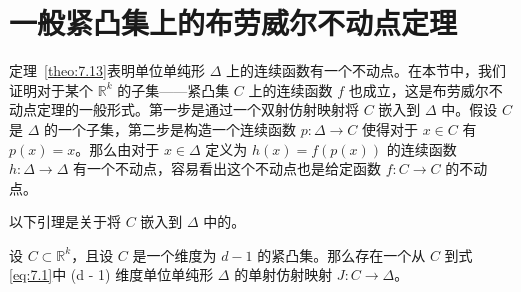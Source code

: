 \section{一般紧凸集上的布劳威尔不动点定理}\label{sec-7.6}

定理~\ref{theo:7.13}表明单位单纯形 \(\Delta\) 上的连续函数有一个不动点。在本节中，我们证明对于某个 \({\mathbb{R}}^{k}\) 的子集——紧凸集 \(C\) 上的连续函数 \(f\) 也成立，这是布劳威尔不动点定理的一般形式。第一步是通过一个双射仿射映射将 \(C\) 嵌入到 \(\Delta\) 中。假设 \(C\) 是 \(\Delta\) 的一个子集，第二步是构造一个连续函数 \(p : \Delta  \rightarrow  C\) 使得对于 \(x \in  C\) 有 \(p\left( x\right)  = x\)。那么由对于 \(x \in  \Delta\) 定义为 \(h\left( x\right)  = f\left( {p\left( x\right) }\right)\) 的连续函数 \(h : \Delta  \rightarrow  \Delta\) 有一个不动点，容易看出这个不动点也是给定函数 \(f : C \rightarrow  C\) 的不动点。

以下引理是关于将 \(C\) 嵌入到 \(\Delta\) 中的。
\begin{lemma}\label{lem:7.14}
设 \(C \subset  {\mathbb{R}}^{k}\)，且设 \(C\) 是一个维度为 \(d - 1\) 的紧凸集。那么存在一个从 \(C\) 到式\eqref{eq:7.1}中 (d - 1) 维度单位单纯形 \(\Delta\) 的单射仿射映射 \(J : C \rightarrow  \Delta\)。
\end{lemma}

